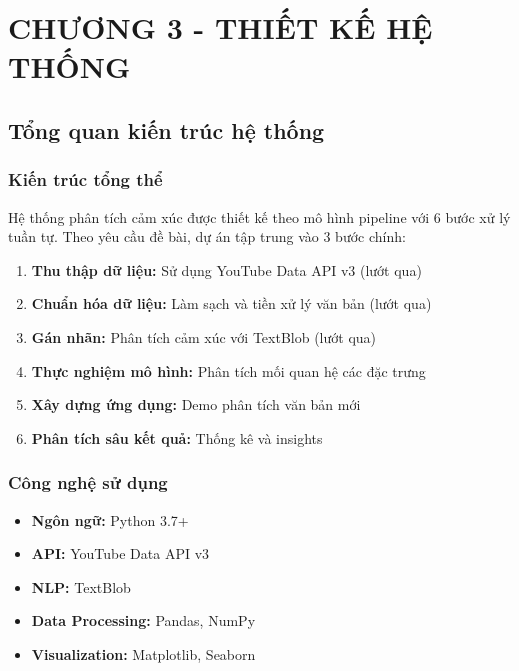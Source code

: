 
\section*{CHƯƠNG 3 - THIẾT KẾ HỆ THỐNG}
\setcounter{section}{3}
\setcounter{subsection}{0}
\setcounter{figure}{0}
\setcounter{table}{0}

\subsection{Tổng quan kiến trúc hệ thống}

\subsubsection{Kiến trúc tổng thể}
Hệ thống phân tích cảm xúc được thiết kế theo mô hình pipeline với 6 bước xử lý tuần tự. Theo yêu cầu đề bài, dự án tập trung vào 3 bước chính:

\begin{enumerate}
    \item \textbf{Thu thập dữ liệu:} Sử dụng YouTube Data API v3 (lướt qua)
    \item \textbf{Chuẩn hóa dữ liệu:} Làm sạch và tiền xử lý văn bản (lướt qua)
    \item \textbf{Gán nhãn:} Phân tích cảm xúc với TextBlob (lướt qua)
    \item \textbf{Thực nghiệm mô hình:} Phân tích mối quan hệ các đặc trưng
    \item \textbf{Xây dựng ứng dụng:} Demo phân tích văn bản mới
    \item \textbf{Phân tích sâu kết quả:} Thống kê và insights
\end{enumerate}

\subsubsection{Công nghệ sử dụng}
\begin{itemize}
    \item \textbf{Ngôn ngữ:} Python 3.7+
    \item \textbf{API:} YouTube Data API v3
    \item \textbf{NLP:} TextBlob
    \item \textbf{Data Processing:} Pandas, NumPy
    \item \textbf{Visualization:} Matplotlib, Seaborn
\end{itemize}

